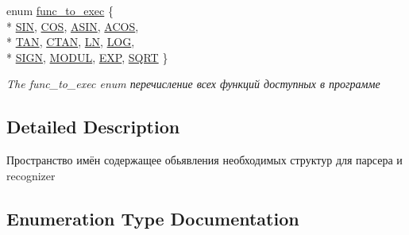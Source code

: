 \begin{DoxyCompactItemize}
enum \hyperlink{namespaceNSParser_aae20df1402d72f463a1a9efe3ce1a9b9}{func\+\_\+to\+\_\+exec} \{ \\*
\hyperlink{namespaceNSParser_aae20df1402d72f463a1a9efe3ce1a9b9a27583ac72ebf80402125b171fafa8819}{S\+I\+N}, 
\hyperlink{namespaceNSParser_aae20df1402d72f463a1a9efe3ce1a9b9ab07effe3bb5c293e74b3ffdf8910e9f7}{C\+O\+S}, 
\hyperlink{namespaceNSParser_aae20df1402d72f463a1a9efe3ce1a9b9a68ae975169c90b9cb6232cec5bbeebca}{A\+S\+I\+N}, 
\hyperlink{namespaceNSParser_aae20df1402d72f463a1a9efe3ce1a9b9a6e166b7b8ca1eb0877e5906ec1433bb2}{A\+C\+O\+S}, 
\\*
\hyperlink{namespaceNSParser_aae20df1402d72f463a1a9efe3ce1a9b9a14eb2e9650d2c58c2f0a54ce8eb32792}{T\+A\+N}, 
\hyperlink{namespaceNSParser_aae20df1402d72f463a1a9efe3ce1a9b9a25ff62fb6a1e42f59f3b2a70d31ad875}{C\+T\+A\+N}, 
\hyperlink{namespaceNSParser_aae20df1402d72f463a1a9efe3ce1a9b9aa1683bf9eb7c51325f4c14776cb1063b}{L\+N}, 
\hyperlink{namespaceNSParser_aae20df1402d72f463a1a9efe3ce1a9b9a9667a30f73605cf32db6c8c94ab528da}{L\+O\+G}, 
\\*
\hyperlink{namespaceNSParser_aae20df1402d72f463a1a9efe3ce1a9b9ae049848210127b105cfc43deae883072}{S\+I\+G\+N}, 
\hyperlink{namespaceNSParser_aae20df1402d72f463a1a9efe3ce1a9b9ae8c0916769d2afe15d9edacaa3346851}{M\+O\+D\+U\+L}, 
\hyperlink{namespaceNSParser_aae20df1402d72f463a1a9efe3ce1a9b9a189aff615329a6c73a15282170e4aefb}{E\+X\+P}, 
\hyperlink{namespaceNSParser_aae20df1402d72f463a1a9efe3ce1a9b9a4051b90258c729c4fdd863f44041a25b}{S\+Q\+R\+T}
 \}
\begin{DoxyCompactList}\small\item\em The func\+\_\+to\+\_\+exec enum перечисление всех функций доступных в программе \end{DoxyCompactList}\end{DoxyCompactItemize}


\subsection{Detailed Description}
Пространство имён содержащее обьявления необходимых структур для парсера и recognizer 

\subsection{Enumeration Type Documentation}
\hypertarget{namespaceNSParser_aae20df1402d72f463a1a9efe3ce1a9b9}{}
